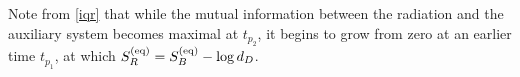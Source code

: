 \documentclass[a4paper,11pt]{article}
\newcommand{\SV}[1]{\textcolor{red}{#1}}
\newcommand\sN{{\ensuremath{{\mathcal N}}}}
\begin{document}
\begin{enumerate}
Note from \eqref{iqr} that while the mutual information between the radiation and the auxiliary system becomes maximal at $t_{p_2}$, it begins to grow from zero at an earlier time $t_{p_1}$, at which $S^{\rm (eq)}_R =S^{\rm (eq)}_B- \log d_D$. 







\begin{comment} 
\SV{I tried to include the points made in the discussion below, please check if anything should be added [}
The Hayden-Preskill set-up is not compatible with the current formulation of the equilibrium approximation. This is because it is clear that the reference system $Q$ does not thermalize with $R\cup B'$ at late times due to trivial time evolution on $Q$ and special initial conditions that entangle the two systems. We thus need to generalize the formalism to include this set-up.



\end{comment}
\end{enumerate}
\end{document}
